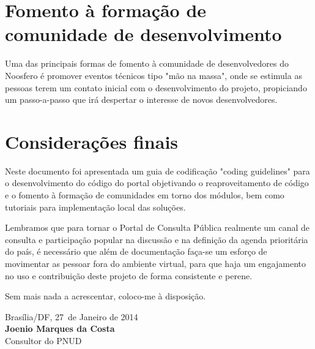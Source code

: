 \documentclass[11pt]{article}
\newcommand{\MyName}{Joenio Marques da Costa}
\newcommand{\MesEntrega}{Janeiro de 2014}
\newcommand{\DiaEntrega}{27}
\begin{document}
\section{Fomento à formação de comunidade de desenvolvimento}

Uma das principais formas de fomento à comunidade de desenvolvedores do
Noosfero é promover eventos técnicos tipo "mão na massa", onde se estimula as
pessoas terem um contato inicial com o desenvolvimento do projeto, propiciando
um passo-a-passo que irá despertar o interesse de novos desenvolvedores.

\section{Considerações finais}

Neste documento foi apresentada um guia de codificação "coding guidelines"
para o desenvolvimento do código do portal objetivando o reaproveitamento de
código e o fomento à formação de comunidades em torno dos módulos, bem como
tutoriais para implementação local das soluções.

Lembramos que para tornar o Portal de Consulta Pública realmente um canal de
consulta e participação popular na discussão e na definição da agenda
prioritária do país, é necessário que além de documentação faça-se um esforço
de movimentar as pessoar fora do ambiente virtual, para que haja um
engajamento no uso e contribuição deste projeto de forma consistente e perene.

\vspace{1cm}

Sem mais nada a acrescentar, coloco-me à disposição.

\vspace{1cm}

\begin{minipage}{\textwidth}
  Brasília/DF, \DiaEntrega \ de \MesEntrega\\[1cm]
  \textbf{\MyName}\\
  \small Consultor do PNUD
\end{minipage}

%
\end{document}
